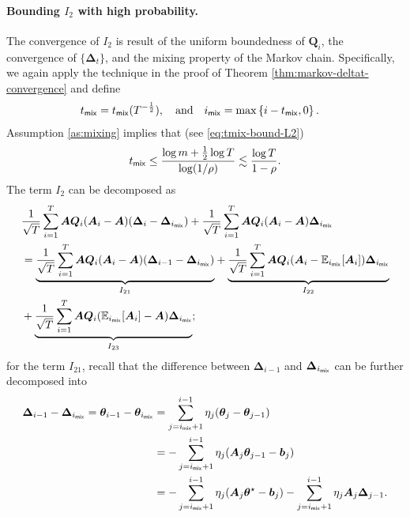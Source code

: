 \paragraph{Bounding $I_2$ with high probability.} The convergence of $I_2$ is result of the uniform boundedness of  $\bm{Q}_i$, the convergence of $\{\bm{\Delta}_t\}$, and the mixing property of the Markov chain. Specifically, we again apply the technique in the proof of Theorem \ref{thm:markov-deltat-convergence} and define
\begin{align}\label{eq:defn-markov-CLT-tmix}
&t_{\mathsf{mix}} = t_{\mathsf{mix}}(T^{-\frac{1}{2}}), \quad \text{and} \quad i_{\mathsf{mix}} = \max\left\{i-t_{\mathsf{mix}}, 0\right\}.
\end{align}
Assumption \ref{as:mixing} implies that (see \ref{eq:tmix-bound-L2}) 
\begin{align}
\label{eq:tmix.bound}
t_{\mathsf{mix}} \leq \frac{\log m + \frac{1}{2}\log T}{\log(1/\rho)} \lesssim \frac{\log T}{1-\rho}.
\end{align}
The term $I_2$ can be decomposed as
\begin{align*}
&\frac{1}{\sqrt{T}} \sum_{i=1}^T \bm{AQ}_i(\bm{A}_i - \bm{A}) (\bm{\Delta}_i -\bm{\Delta}_{i_{\mathsf{mix}}}) + \frac{1}{\sqrt{T}}\sum_{i=1}^T \bm{AQ}_i(\bm{A}_i - \bm{A}) \bm{\Delta}_{i_{\mathsf{mix}}} \\
&= \underset{I_{21}}{\underbrace{\frac{1}{\sqrt{T}} \sum_{i=1}^T \bm{AQ}_i(\bm{A}_i - \bm{A}) (\bm{\Delta}_{i-1} -\bm{\Delta}_{i_{\mathsf{mix}}})}} + \underset{I_{22}}{\underbrace{\frac{1}{\sqrt{T}}\sum_{i=1}^T \bm{AQ}_i(\bm{A}_i - \mathbb{E}_{i_{\mathsf{mix}}}[\bm{A}_i])\bm{\Delta}_{i_{\mathsf{mix}}} }}\\ 
&+ \underset{I_{23}}{\underbrace{\frac{1}{\sqrt{T}}\sum_{i=1}^T \bm{AQ}_i(\mathbb{E}_{i_{\mathsf{mix}}}[\bm{A}_i] - \bm{A}) \bm{\Delta}_{i_{\mathsf{mix}}} }};
\end{align*}
for the term $I_{21}$, recall that the difference between $\bm{\Delta}_{i-1}$ and $\bm{\Delta}_{i_{\mathsf{mix}}}$ can be further decomposed into
\begin{align*}
\bm{\Delta}_{i-1}-\bm{\Delta}_{i_{\mathsf{mix}}} = \bm{\theta}_{i-1} - \bm{\theta}_{i_{\mathsf{mix}}} &= \sum_{j=i_{\mathsf{mix}}+1}^{i-1} \eta_j (\bm{\theta}_{j} - \bm{\theta}_{j-1})\\  
&= -\sum_{j=i_{\mathsf{mix}}+1}^{i-1} \eta_j(\bm{A}_j \bm{\theta}_{j-1} - \bm{b}_j) \\ 
&= -\sum_{j=i_{\mathsf{mix}}+1}^{i-1} \eta_j(\bm{A}_j \bm{\theta}^\star - \bm{b}_j) - \sum_{j=i_{\mathsf{mix}}+1}^{i-1} \eta_j\bm{A}_j \bm{\Delta}_{j-1}.
\end{align*}

